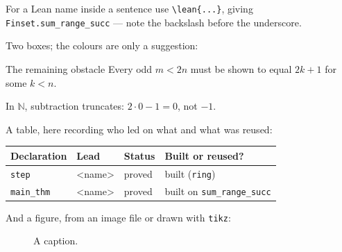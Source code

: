 \documentclass[11pt,a4paper]{article}
\newcommand{\lean}[1]{\texttt{#1}}
\begin{document}
For a Lean name inside a sentence use \lean{\textbackslash lean\{...\}},
giving \lean{Finset.sum\_range\_succ} --- note the backslash before the
underscore.

Two boxes; the colours are only a suggestion:

\begin{keybox}{The remaining obstacle}
Every odd $m < 2n$ must be shown to equal $2k+1$ for some $k < n$.
\end{keybox}

\begin{notebox}
In $\mathbb{N}$, subtraction truncates: $2 \cdot 0 - 1 = 0$, not $-1$.
\end{notebox}

A table, here recording who led on what and what was reused:

\begin{center}
\small
\begin{tabular}{@{}llll@{}}
\toprule
\textbf{Declaration} & \textbf{Lead} & \textbf{Status} & \textbf{Built or reused?} \\
\midrule
\lean{step}      & <name> & proved & built (\lean{ring}) \\
\lean{main\_thm} & <name> & proved & built on \lean{sum\_range\_succ} \\
\bottomrule
\end{tabular}
\end{center}

And a figure, from an image file or drawn with \lean{tikz}:

\begin{figure}[ht]
  \centering
  \caption{A caption.}\label{fig:example}
\end{figure}
\end{document}
